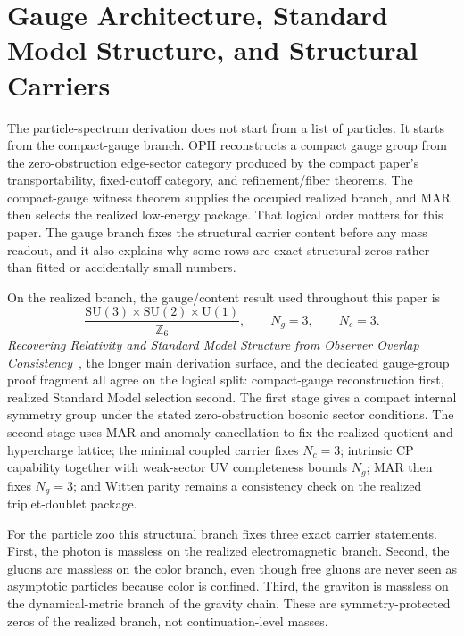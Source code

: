 \documentclass[11pt]{article}
\newcommand{\SU}{\mathrm{SU}}
\newcommand{\U}{\mathrm{U}}
\begin{document}
\section{Gauge Architecture, Standard Model Structure, and Structural Carriers}

The particle-spectrum derivation does not start from a list of particles. It starts from the
compact-gauge branch. OPH reconstructs a compact gauge
group from the zero-obstruction edge-sector category produced by the compact paper's
transportability, fixed-cutoff category, and refinement/fiber theorems. The compact-gauge witness theorem supplies the occupied realized branch, and MAR then selects the
realized low-energy package. That logical order matters for this paper. The
gauge branch fixes the structural carrier content before any mass readout, and it also explains
why some rows are exact structural zeros rather than fitted or accidentally small numbers.

On the realized branch, the gauge/content result used throughout this paper is
\[
\frac{\SU(3)\times\SU(2)\times\U(1)}{\mathbb Z_6},
\qquad
N_g=3,
\qquad
N_c=3.
\]
\emph{Recovering Relativity and Standard Model Structure from Observer Overlap Consistency}~\cite{ophcompact}, the longer main derivation surface, and the dedicated gauge-group proof
fragment all agree on the logical split: compact-gauge reconstruction first, realized Standard
Model selection second. The first stage gives a compact internal symmetry group under the stated
zero-obstruction bosonic sector conditions. The second stage uses MAR and anomaly cancellation to fix the realized
quotient and hypercharge lattice; the minimal coupled carrier fixes \(N_c=3\); intrinsic CP
capability together with weak-sector UV completeness bounds \(N_g\); MAR then fixes \(N_g=3\);
and Witten parity remains a consistency check on the realized triplet-doublet package.

For the particle zoo this structural branch fixes three exact carrier statements.
First, the photon is massless on the realized electromagnetic branch. Second, the gluons are
massless on the color branch, even though free gluons are never seen as asymptotic particles
because color is confined. Third, the graviton is massless on the dynamical-metric branch of the
gravity chain. These are symmetry-protected zeros of the realized branch, not continuation-level
masses.
\end{document}

